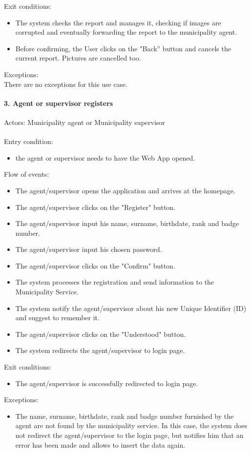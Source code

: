 \documentclass[a4paper]{report}
\begin{document}
Exit conditions:
\begin{itemize}
\item The system checks the report and manages it, checking if images are corrupted and eventually forwarding the report to the municipality agent.
\item	Before confirming, the User clicks on the "Back” button and cancels the current report. Pictures are cancelled too. 
\end{itemize}
Exceptions: \\
There are no exceptions for this use case. 
\\
\\
\textbf{3. Agent or supervisor registers}\label{uc:3}
\\
\\
Actors: Municipality agent or Municipality supervisor \\ \\
Entry condition:
\begin{itemize}
\item the agent or supervisor needs to have the Web App opened.
\end{itemize}
Flow of events:
\begin{itemize}
\item The agent/supervisor opens the application and arrives at the homepage.
\item The agent/supervisor clicks on the "Register" button.
\item The agent/supervisor input his name, surname, birthdate, rank and badge number.
\item The agent/supervisor input his chosen password.
\item The agent/supervisor clicks on the "Confirm" button.
\item The system processes the registration and send information to the Municipality Service.
\item The system notify the agent/supervisor about his new Unique Identifier (ID) and suggest to remember it. 
\item The agent/supervisor clicks on the "Understood" button.
\item The system redirects the agent/supervisor to login page.
\end{itemize}
Exit conditions:
\begin{itemize}
\item The agent/supervisor is successfully redirected to login page.
 \end{itemize}
Exceptions: 
 \begin{itemize}
 \item The name, surname, birthdate, rank and badge number furnished by the agent are not found by the municipality service. In this case, the system does not redirect the agent/supervisor to the login page, but notifies him that an error has been made and allows to insert the data again.
\end{itemize}
\end{document}
